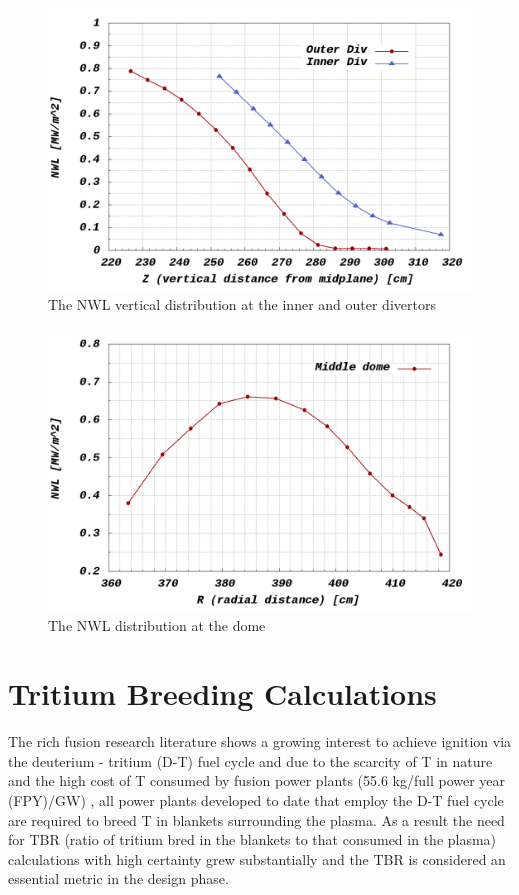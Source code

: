 \documentclass[12pt, letterpaper]{elsarticle}
\begin{document}
\begin{figure}[h!]
  \centering
  \includegraphics[scale=0.3]{../plots/NWL_2divs.png}
  \caption{The NWL vertical distribution at the inner and outer divertors}
  \label{fig:NWL 2Divs}
\end{figure}
\begin{figure}[h!]
	\centering
	\includegraphics[scale=0.3]{../plots/NWL_div.png}
	\caption{The NWL distribution at the dome}
	\label{fig:NWL Dome}
\end{figure}

\section{Tritium Breeding Calculations} \label{Tritium Breeding Calculations}
The rich fusion research literature shows a growing interest to achieve ignition via the deuterium - tritium (D-T) fuel cycle and due to the scarcity of T in nature and the high cost of T consumed by fusion power plants (55.6 kg/full power year (FPY)/GW) \cite{ref_3}, all power plants developed to date that employ the D-T fuel cycle are required to breed T in blankets surrounding the plasma. As a result the need for TBR (ratio of tritium bred in the blankets to that consumed in the plasma) calculations with high certainty grew substantially and the TBR is considered an essential metric in the design phase.\vspace{5mm}
\end{document}
